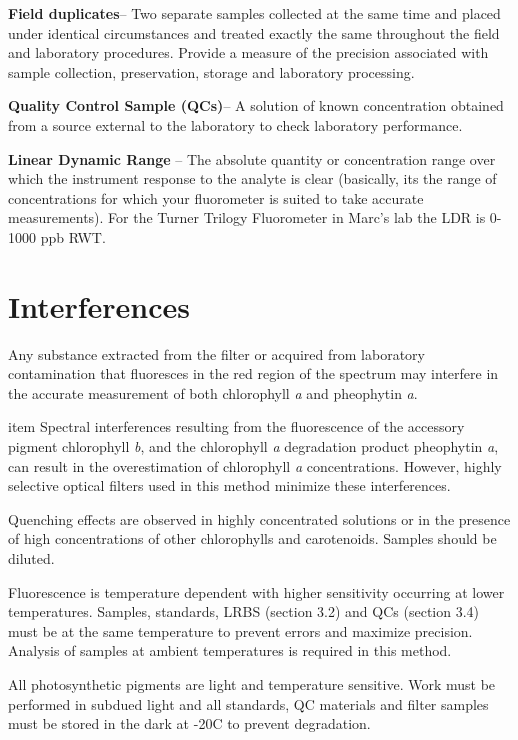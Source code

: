 \documentclass[12pt]{../SOP3_alpha}
\begin{document}
\NP \textbf{Field duplicates}-- Two separate samples collected at the same time and placed under identical circumstances and treated exactly the same throughout the field and laboratory procedures. Provide a measure of the precision associated with sample collection, preservation, storage and laboratory processing. 

\NP \textbf{Quality Control Sample (QCs)}-- A solution of known concentration obtained from a source external to the laboratory to check laboratory performance.

\NP \textbf{Linear Dynamic Range} -- The absolute quantity or concentration range over which the instrument response to the analyte is clear (basically, its the range of concentrations for which your fluorometer is suited to take accurate measurements). For the Turner Trilogy Fluorometer in Marc's lab the LDR is 0-1000 ppb RWT. 


\section{Interferences}
\NP Any substance extracted from the filter or acquired from laboratory contamination that fluoresces in the red region of the spectrum may interfere in the accurate measurement of both chlorophyll \textit{a} and pheophytin \textit{a}.

\NP item Spectral interferences resulting from the fluorescence of the accessory pigment chlorophyll \textit{b}, and the chlorophyll \textit{a} degradation product pheophytin \textit{a}, can result in the overestimation of chlorophyll \textit{a} concentrations. However, highly selective optical filters used in this method minimize these interferences.

\NP Quenching effects are observed in highly concentrated solutions or in the presence of high concentrations of other chlorophylls and carotenoids. Samples should be diluted.

\NP Fluorescence is temperature dependent with higher sensitivity occurring at lower temperatures. Samples, standards, LRBS (section 3.2) and QCs (section 3.4) must be at the same temperature to prevent errors and maximize precision. Analysis of samples at ambient temperatures is required in this method.

\NP All photosynthetic pigments are light and temperature sensitive. Work must be performed in subdued light and all standards, QC materials and filter samples must be stored in the dark at -20\degree C to prevent degradation.
\end{document}
